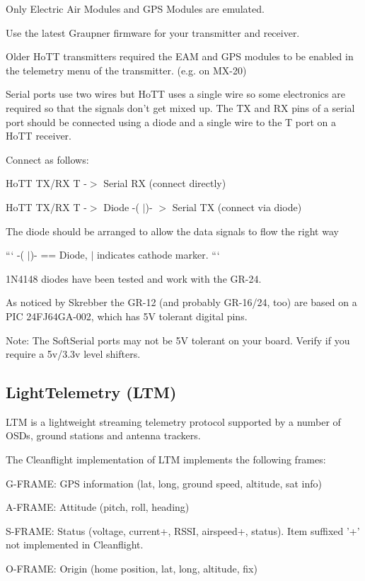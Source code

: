 Only Electric Air Modules and G\+P\+S Modules are emulated.

Use the latest Graupner firmware for your transmitter and receiver.

Older Ho\+T\+T transmitters required the E\+A\+M and G\+P\+S modules to be enabled in the telemetry menu of the transmitter. (e.\+g. on M\+X-\/20)

Serial ports use two wires but Ho\+T\+T uses a single wire so some electronics are required so that the signals don't get mixed up. The T\+X and R\+X pins of a serial port should be connected using a diode and a single wire to the {\ttfamily T} port on a Ho\+T\+T receiver.

Connect as follows\+:


\begin{DoxyItemize}
\item Ho\+T\+T T\+X/\+R\+X {\ttfamily T} -\/$>$ Serial R\+X (connect directly)
\item Ho\+T\+T T\+X/\+R\+X {\ttfamily T} -\/$>$ Diode {\ttfamily -\/( $\vert$)-\/} $>$ Serial T\+X (connect via diode)
\end{DoxyItemize}

The diode should be arranged to allow the data signals to flow the right way

``` -\/( $\vert$)-\/ == Diode, $\vert$ indicates cathode marker. ```

1\+N4148 diodes have been tested and work with the G\+R-\/24.

As noticed by Skrebber the G\+R-\/12 (and probably G\+R-\/16/24, too) are based on a P\+I\+C 24\+F\+J64\+G\+A-\/002, which has 5\+V tolerant digital pins.

Note\+: The Soft\+Serial ports may not be 5\+V tolerant on your board. Verify if you require a 5v/3.\+3v level shifters.

\subsection*{Light\+Telemetry (L\+T\+M)}

L\+T\+M is a lightweight streaming telemetry protocol supported by a number of O\+S\+Ds, ground stations and antenna trackers.

The Cleanflight implementation of L\+T\+M implements the following frames\+:


\begin{DoxyItemize}
\item G-\/\+F\+R\+A\+M\+E\+: G\+P\+S information (lat, long, ground speed, altitude, sat info)
\item A-\/\+F\+R\+A\+M\+E\+: Attitude (pitch, roll, heading)
\item S-\/\+F\+R\+A\+M\+E\+: Status (voltage, current+, R\+S\+S\+I, airspeed+, status). Item suffixed '+' not implemented in Cleanflight.
\item O-\/\+F\+R\+A\+M\+E\+: Origin (home position, lat, long, altitude, fix)
\end{DoxyItemize}

